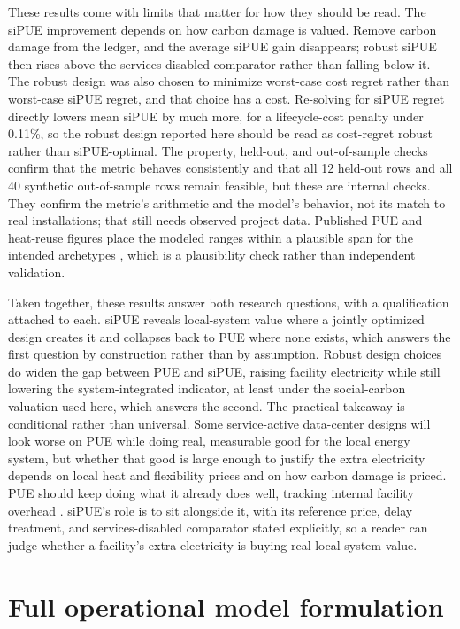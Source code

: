 \documentclass[preprint,12pt]{elsarticle}
\begin{document}
These results come with limits that matter for how they should be read. The siPUE improvement depends on how carbon damage is valued. Remove carbon damage from the ledger, and the average siPUE gain disappears; robust siPUE then rises above the services-disabled comparator rather than falling below it. The robust design was also chosen to minimize worst-case cost regret rather than worst-case siPUE regret, and that choice has a cost. Re-solving for siPUE regret directly lowers mean siPUE by much more, for a lifecycle-cost penalty under 0.11\%, so the robust design reported here should be read as cost-regret robust rather than siPUE-optimal. The property, held-out, and out-of-sample checks confirm that the metric behaves consistently and that all 12 held-out rows and all 40 synthetic out-of-sample rows remain feasible, but these are internal checks. They confirm the metric's arithmetic and the model's behavior, not its match to real installations; that still needs observed project data. Published PUE and heat-reuse figures place the modeled ranges within a plausible span for the intended archetypes \cite{UptimeInstitute2024Survey,EUSmartCities2024Mantsala}, which is a plausibility check rather than independent validation.

Taken together, these results answer both research questions, with a qualification attached to each. siPUE reveals local-system value where a jointly optimized design creates it and collapses back to PUE where none exists, which answers the first question by construction rather than by assumption. Robust design choices do widen the gap between PUE and siPUE, raising facility electricity while still lowering the system-integrated indicator, at least under the social-carbon valuation used here, which answers the second. The practical takeaway is conditional rather than universal. Some service-active data-center designs will look worse on PUE while doing real, measurable good for the local energy system, but whether that good is large enough to justify the extra electricity depends on local heat and flexibility prices and on how carbon damage is priced. PUE should keep doing what it already does well, tracking internal facility overhead \cite{Belady2008PUE,ISO30134}. siPUE's role is to sit alongside it, with its reference price, delay treatment, and services-disabled comparator stated explicitly, so a reader can judge whether a facility's extra electricity is buying real local-system value.

\appendix
\section{Full operational model formulation}
\label{app:model}
\end{document}
